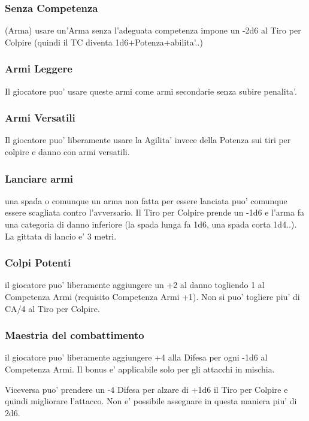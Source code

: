 \documentclass[a4paper,11pt,twoside,openany]{book}
\begin{document}
\subsubsection{Senza Competenza} (Arma) usare un'Arma senza l'adeguata competenza impone un -2d6 al Tiro per Colpire (quindi il TC diventa 1d6+Potenza+abilita'..) 

\subsubsection{Armi Leggere} Il giocatore puo' usare queste armi come armi secondarie senza subire penalita'.

\subsubsection{Armi Versatili} Il giocatore puo' liberamente usare la Agilita' invece della Potenza sui tiri per colpire e danno con armi versatili.

\subsubsection{Lanciare armi} una spada o comunque un arma non fatta per essere lanciata puo' comunque essere scagliata contro l'avversario.
Il Tiro per Colpire prende un -1d6 e l'arma fa una categoria di danno inferiore (la spada lunga fa 1d6, una spada corta 1d4..). La gittata di lancio e' 3 metri.

\subsubsection{Colpi Potenti} il giocatore puo' liberamente aggiungere un +2 al danno togliendo 1 al Competenza Armi (requisito Competenza Armi +1). Non si puo' togliere piu' di CA/4 al Tiro per Colpire.

\subsubsection{Maestria del combattimento} il giocatore puo' liberamente aggiungere +4 alla Difesa per ogni -1d6 al Competenza Armi. Il bonus e' applicabile solo per gli attacchi in mischia.

Viceversa puo' prendere un -4 Difesa per alzare di +1d6 il Tiro per Colpire e quindi migliorare l'attacco. Non e' possibile assegnare in questa maniera piu' di 2d6.
\end{document}
